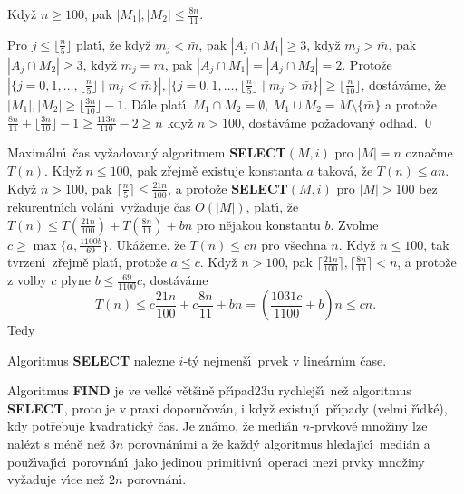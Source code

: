 \documentclass[a4paper,12pt]{article}
\begin{document}
Kdy\v z $n\ge 100$, pak $|M_1|,|M_2|\le\frac {8n}{
11}$.
\endproclaim

 Pro $j\le\lfloor\frac n5\rfloor$ plat\'\i , \v ze kdy\v z $
m_j<\bar {m}$, pak 
$|A_j\cap M_1|\ge 3$, kdy\v z $m_j>\bar {m}$, pak $|A_j\cap M_2|\ge 
3$, kdy\v z $m_j=\bar {m}$, 
pak $|A_j\cap M_1|=|A_j\cap M_2|=2$.  Proto\v ze 
$|\{j=0,1,\dots,\lfloor\frac n5\rfloor\mid m_j<\bar {m}\}|,|\{j=0
,1,\dots,\lfloor\frac n5\rfloor\mid m_j>\bar {m}\}|\ge\lfloor\frac 
n{10}\rfloor$, 
dost\'av\'ame, \v ze $|M_1|,|M_2|\ge\lfloor\frac {3n}{10}\rfloor 
-1$.  D\'ale plat\'\i\ $M_1\cap M_2=\emptyset$, 
$M_1\cup M_2=M\setminus \{\bar {m}\}$ a proto\v ze $\frac {8n}{11}
+\lfloor\frac {3n}{10}\rfloor -1\ge\frac {113n}{110}-2\ge n$ 
kdy\v z $n>100$, dost\'av\'ame po\v zadovan\'y odhad. \qed
\enddemo

\flushpar Maxim\'aln\'\i\ \v cas vy\v zadovan\'y algoritmem  
{\bf SELECT$(M,i)$} pro $|M|=n$ ozna\v cme $T(n)$.  Kdy\v z $n\le 
100$, pak z\v rejm\v e 
exis\-tuje konstanta $a$ takov\'a, \v ze $T(n)\le an$.  Kdy\v z $
n>100$, 
pak $\lceil\frac n5\rceil\le\frac {21n}{100}$, a proto\v ze {\bf SELECT$
(M,i)$} pro $|M|>100$ bez 
rekurentn\'\i ch vol\'an\'\i\ vy\v zaduje \v cas $O(|M|)$, plat\'\i , \v ze $
T(n)\le T(\frac {21n}{100})+T(\frac {8n}{11})+bn$ pro n\v ejakou konstantu 
$b$.  Zvolme $c\ge\max\{a,\frac {1100b}{69}\}$. Uk\'a\v zeme, \v ze $
T(n)\le cn$ pro 
v\v sechna $n$.  
Kdy\v z $n\le 100$, tak tvrzen\'\i\ z\v rejm\v e plat\'\i , proto\v ze $
a\le c$.  Kdy\v z 
$n>100$, pak $\lceil\frac {21n}{100}\rceil ,\lceil\frac {8n}{11}\rceil 
<n$, a proto\v ze z volby $c$ plyne 
$b\le\frac {69}{1100}c$, 
dost\'av\'ame 
$$T(n)\le c\frac {21n}{100}+c\frac {8n}{11}+bn=(\frac {1031c}{110
0}+b)n\le cn.$$
Tedy
\medskip

Algoritmus {\bf SELECT} nalezne $i$-t\'y nejmen\v s\'\i\ 
prvek v line\'arn\'\i m \v case.
\endproclaim
\medskip

\flushpar Algoritmus {\bf FIND} je ve velk\'e v\v et\v sin\v e 
p\v r\'\i pad\accent23u 
rychlej\v s\'\i\ ne\v z algoritmus {\bf SELECT}, proto je v praxi 
doporu\v cov\'an, i kdy\v z existuj\'\i\ 
p\v r\'\i pady (velmi \v r\'\i dk\'e), kdy pot\v rebuje kvadratick\'y \v cas.
Je zn\'amo, \v ze medi\'an $n$-prvkov\'e mno\v ziny lze nal\'ezt s 
m\'en\v e ne\v z $3n$ porovn\'an\'\i mi a \v ze ka\v zd\'y algoritmus hledaj\'\i c\'\i\ 
medi\'an a pou\v z\'\i vaj\'\i c\'\i\ porovn\'an\'\i\ jako jedinou primitivn\'\i\ 
operaci mezi prvky mno\v ziny vy\v zaduje v\'\i ce ne\v z $2n$ 
porovn\'an\'\i .
\bigskip
\end{document}
